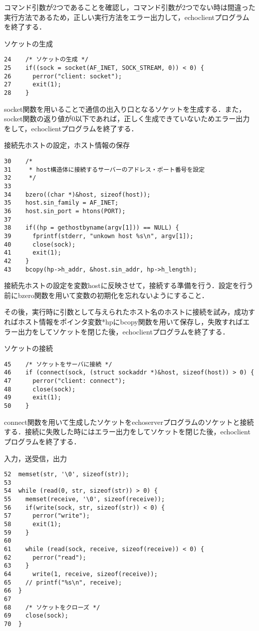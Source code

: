 \documentclass[a4j]{jarticle}
\newenvironment{bit}{\begin{breakitembox}}{\end{breakitembox}} %
\newcommand{\esp}{echoserverプログラム}
\newcommand{\ecp}{echoclientプログラム}
\begin{document}
コマンド引数が2つであることを確認し，コマンド引数が2つでない時は間違った実行方法であるため，正しい実行方法をエラー出力して，\ecp を終了する．

\begin{bit}[l]{ソケットの生成}
\begin{verbatim}
24	  /* ソケットの生成 */
25	  if((sock = socket(AF_INET, SOCK_STREAM, 0)) < 0) {
26	    perror("client: socket");
27	    exit(1);
28	  }
\end{verbatim}
\end{bit}

socket関数を用いることで通信の出入り口となるソケットを生成する．また，socket関数の返り値が0以下であれば，正しく生成できていないためエラー出力をして，\ecp を終了する．

\begin{bit}[l]{接続先ホストの設定，ホスト情報の保存}
\begin{verbatim}
30	  /*
31	   * host構造体に接続するサーバーのアドレス・ポート番号を設定
32	   */
33
34	  bzero((char *)&host, sizeof(host));
35	  host.sin_family = AF_INET;
36	  host.sin_port = htons(PORT);
37
38	  if((hp = gethostbyname(argv[1])) == NULL) {
39	    fprintf(stderr, "unkown host %s\n", argv[1]);
40	    close(sock);
41	    exit(1);
42	  }
43	  bcopy(hp->h_addr, &host.sin_addr, hp->h_length);
\end{verbatim}
\end{bit}

接続先ホストの設定を変数hostに反映させて，接続する準備を行う．設定を行う前にbzero関数を用いて変数の初期化を忘れないようにすること．

その後，実行時に引数として与えられたホスト名のホストに接続を試み，成功すればホスト情報をポインタ変数*hpにbcopy関数を用いて保存し，失敗すればエラー出力をしてソケットを閉じた後，\ecp を終了する．

\begin{bit}[l]{ソケットの接続}
\begin{verbatim}
45	  /* ソケットをサーバに接続 */
46	  if (connect(sock, (struct sockaddr *)&host, sizeof(host)) > 0) {
47	    perror("client: connect");
48	    close(sock);
49	    exit(1);
50	  }
\end{verbatim}
\end{bit}

connect関数を用いて生成したソケットを\esp のソケットと接続する．接続に失敗した時にはエラー出力をしてソケットを閉じた後，\ecp を終了する．

\begin{bit}[l]{入力，送受信，出力}
\begin{verbatim}
52	memset(str, '\0', sizeof(str));
53
54	while (read(0, str, sizeof(str)) > 0) {
55	  memset(receive, '\0', sizeof(receive));
56	  if(write(sock, str, sizeof(str)) < 0) {
57	    perror("write");
58	    exit(1);
59	  }
60
61	  while (read(sock, receive, sizeof(receive)) < 0) {
62	    perror("read");
63	  }
64	    write(1, receive, sizeof(receive));
65	  // printf("%s\n", receive);
66	}
67
68	  /* ソケットをクローズ */
69	  close(sock);
70	}
\end{verbatim}
\end{bit}
\end{document}
